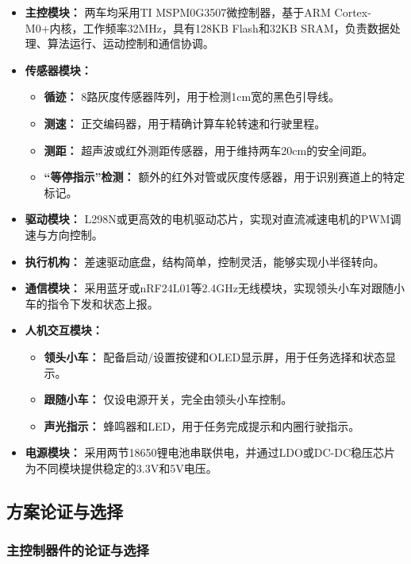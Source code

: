 \documentclass[UTF8]{ctexart}
\begin{document}
\begin{itemize}
    \item \textbf{主控模块：} 两车均采用TI MSPM0G3507微控制器，基于ARM Cortex-M0+内核，工作频率32MHz，具有128KB Flash和32KB SRAM，负责数据处理、算法运行、运动控制和通信协调。
    \item \textbf{传感器模块：} 
        \begin{itemize}
            \item \textbf{循迹：} 8路灰度传感器阵列，用于检测1cm宽的黑色引导线。
            \item \textbf{测速：} 正交编码器，用于精确计算车轮转速和行驶里程。
            \item \textbf{测距：} 超声波或红外测距传感器，用于维持两车20cm的安全间距。
            \item \textbf{``等停指示''检测：} 额外的红外对管或灰度传感器，用于识别赛道上的特定标记。
        \end{itemize}
    \item \textbf{驱动模块：} L298N或更高效的电机驱动芯片，实现对直流减速电机的PWM调速与方向控制。
    \item \textbf{执行机构：} 差速驱动底盘，结构简单，控制灵活，能够实现小半径转向。
    \item \textbf{通信模块：} 采用蓝牙或nRF24L01等2.4GHz无线模块，实现领头小车对跟随小车的指令下发和状态上报。
    \item \textbf{人机交互模块：}
        \begin{itemize}
            \item \textbf{领头小车：} 配备启动/设置按键和OLED显示屏，用于任务选择和状态显示。
            \item \textbf{跟随小车：} 仅设电源开关，完全由领头小车控制。
            \item \textbf{声光指示：} 蜂鸣器和LED，用于任务完成提示和内圈行驶指示。
        \end{itemize}
    \item \textbf{电源模块：} 采用两节18650锂电池串联供电，并通过LDO或DC-DC稳压芯片为不同模块提供稳定的3.3V和5V电压。
\end{itemize}

\subsection{方案论证与选择}

\subsubsection{主控制器件的论证与选择}
\end{document}
